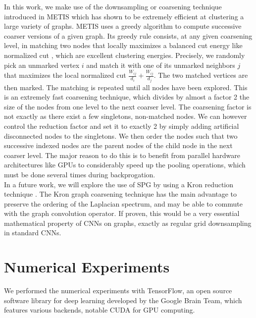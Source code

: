 \documentclass{article}
\begin{document}
In this work, we make use of the downsampling or coarsening technique introduced in METIS \cite{art:DhillonGuanKulis07Graclus,art:KarypisKumar98Metis} which has shown to be extremely efficient at clustering a large variety of graphs. METIS uses a greedy algorithm to compute successive coarser versions of a given graph. Its greedy rule consists, at any given coarsening level, in matching two nodes that locally maximizes a balanced cut energy like normalized cut \cite{art:ShiMalik00NCut}, which are excellent clustering energies. Precisely, we randomly pick an unmarked vertex $i$ and match it with one of its unmarked neighbors $j$ that maximizes the local normalized cut $\frac{W_{ij}}{d_i}+\frac{W_{ij}}{d_j}$. The two matched vertices are then marked. The matching is repeated until all nodes have been explored. This is an extremely fast coarsening technique, which divides by almost a factor 2 the size of the nodes from one level to the next coarser level. The coarsening factor is not exactly as there exist a few singletons, non-matched nodes. We can however control the reduction factor and set it to exactly 2 by simply adding artificial disconnected nodes to the singletons. We then order the nodes such that two successive indexed nodes are the parent nodes of the child node in the next coarser level. The major reason to do this is to benefit from parallel hardware architectures like GPUs to considerably speed up the pooling operations, which must be done several times during backprogation.\\
In a future work, we will explore the use of SPG by using a Kron reduction technique \cite{art:ShumanFarajiVandergheynst16PyramTrans}. The Kron graph coarsening technique has the main advantage to preserve the ordering of the Laplacian spectrum, and may be able to commute with the graph convolution operator. If proven, this would be a very essential mathematical property of CNNs on graphs, exactly as regular grid downsampling in standard CNNs. 









\section{Numerical Experiments}
\vspace{-0.4cm}
We performed the numerical experiments with TensorFlow, an open source software library for deep learning developed by the Google Brain Team, which features various backends, notable CUDA for GPU computing.
 
\end{document}
